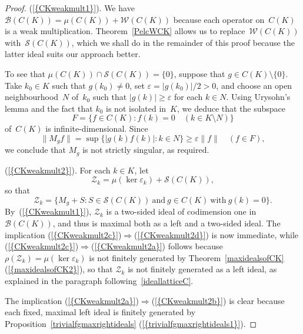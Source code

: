 \documentclass[12pt]{amsart}
\theoremstyle{definition}
\numberwithin{equation}{section}
\begin{document}
\begin{proof} 
  {{\normalfont\textrm{(\ref{{CKweakmult1}})}}}. We have $\mathscr{B}(C(K)) = \mu(C(K)) +
  \mathscr{W}(C(K))$ because each operator on~$C(K)$ is a weak
  multi\-pli\-ca\-tion.  Theorem~\ref{PelcWCK} allows us to
  replace~$\mathscr{W}(C(K))$ with~$\mathscr{S}(C(K))$, which we shall
  do in the remainder of this proof because the latter ideal suits our
  approach better.

  To see that $\mu(C(K))\cap \mathscr{S}(C(K)) = \{0\}$, suppose that
  \mbox{$g\in C(K)\setminus\{0\}$}. Take $k_0\in K$ such that
  $g(k_0)\ne0$, set ${\ensuremath{\varepsilon}} = |g(k_0)|/2>0$, and choose an open
  neighbourhood~$N$ of~$k_0$ such that $|g(k)|{\ensuremath{\geqslant}}{\ensuremath{\varepsilon}}$ for each
  $k\in N$.  Using Urysohn's lemma and the fact that $k_0$ is not
  isolated in~$K$, we deduce that the subspace \[ F = \bigl\{ f\in
  C(K) : f(k) = 0\quad (k\in K\setminus N)\bigr\} \] of~$C(K)$ is
  infinite-dimensional. Since
  \[ \| M_g f\| = \sup\bigl\{ |g(k)f(k)| : k\in N\bigr\}{\ensuremath{\geqslant}} {\ensuremath{\varepsilon}}
  \| f\|\quad (f\in F), \] we conclude that $M_g$ is not strictly
  singular, as required.

  {{\normalfont\textrm{(\ref{{CKweakmult2}})}}}.  For each $k\in K$, let \[ \mathscr{Z}_k =
  \mu(\ker{\ensuremath{\varepsilon}}_k) + \mathscr{S}(C(K)),\] so that
  \[ \mathscr{Z}_k = \bigl\{ M_g + S : S\in\mathscr{S}(C(K))\
  \text{and}\ g\in C(K)\ \text{with}\ g(k) = 0\bigr\}. \]
  By~{{\normalfont\textrm{(\ref{{CKweakmult1}})}}}, $\mathscr{Z}_k$ is a two-sided ideal of
  codimension one in~$\mathscr{B}(C(K))$, and thus is maximal both as
  a left and a two-sided ideal. The implication
  {{\normalfont\textrm{(\ref{{CKweakmult2c}})}}}$\Rightarrow${{\normalfont\textrm{(\ref{{CKweakmult2d}})}}} is now
  immediate, while
  {{\normalfont\textrm{(\ref{{CKweakmult2c}})}}}$\Rightarrow${{\normalfont\textrm{(\ref{{CKweakmult2a}})}}} follows
  because $\rho(\mathscr{Z}_k) = \mu(\ker{\ensuremath{\varepsilon}}_k)$ is not finitely
  generated by Theorem~\ref{maxidealsofCK}{{\normalfont\textrm{(\ref{{maxidealsofCK2}})}}},
  so that $\mathscr{Z}_k$ is not finitely generated as a left ideal,
  as explained in the paragraph following~\eqref{ideallatticeC}.

  The implication
  {{\normalfont\textrm{(\ref{{CKweakmult2a}})}}}$\Rightarrow${{\normalfont\textrm{(\ref{{CKweakmult2b}})}}} is clear
  because each fixed, maximal left ideal is finitely generated by
  Proposition~\ref{trivialfgmaxrightideals}  {{\normalfont\textrm{(\ref{{trivialfgmaxrightideals1}})}}}.


\end{proof}
\end{document}

